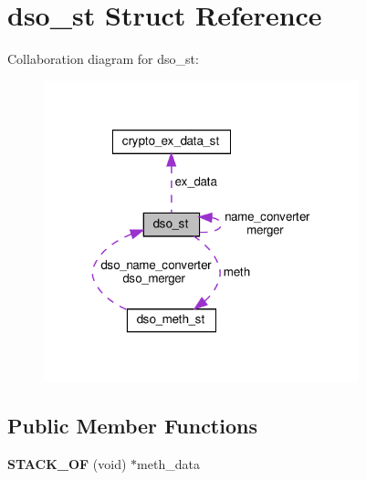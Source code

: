 \hypertarget{structdso__st}{}\section{dso\+\_\+st Struct Reference}
\label{structdso__st}


Collaboration diagram for dso\+\_\+st\+:
\nopagebreak
\begin{figure}[H]
\begin{center}
\leavevmode
\includegraphics[width=259pt]{structdso__st__coll__graph}
\end{center}
\end{figure}
\subsection*{Public Member Functions}
\begin{DoxyCompactItemize}
\item 
\mbox{\label{structdso__st_a6391e8fe452df2d59397101c44d33bc7}} 
{\bfseries S\+T\+A\+C\+K\+\_\+\+OF} (void) $\ast$meth\+\_\+data
\end{DoxyCompactItemize}
